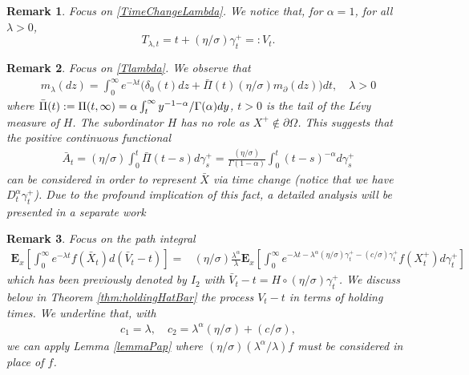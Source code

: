 \documentclass[11pt,a4paper]{article}
\newtheorem{remark}{Remark}[section]
\begin{document}
\begin{remark}
Focus on \eqref{TimeChangeLambda}. We notice that, for $\alpha=1$, for all $\lambda >0$, 
$$T_{\lambda,t}= t + (\eta/\sigma) \gamma^+_t =:V_t.$$
\end{remark}


\begin{remark}
Focus on \eqref{Tlambda}. We observe that
\begin{align*}
m_\lambda(dz) = \int_0^\infty e^{-\lambda t} \bigg( \delta_0(t) dz + \bar{\Pi}(t) (\eta/\sigma) m_\partial(dz) \bigg) dt, \quad \lambda>0
\end{align*}
where $\bar{\Pi}(t):=\Pi(t, \infty) = \alpha \int_t^\infty y^{-1-\alpha}/\Gamma(\-\alpha) dy$, $t>0$ is the tail of the L\'{e}vy measure of $H$. The subordinator $H$ has no role as $X^+ \notin \partial \Omega$. This suggests that the positive continuous functional
\begin{align*}
\bar{A}_t = (\eta/\sigma) \int_0^t \bar{\Pi}(t-s) d\gamma^+_s = \frac{(\eta/\sigma)}{\Gamma(1-\alpha)} \int_0^t (t-s)^{-\alpha} d\gamma^+_s 
\end{align*}
can be considered in order to represent $\bar{X}$ via time change (notice that we have $D^\alpha_t \gamma^+_t$). Due to the profound implication of this fact, a detailed analysis will be presented in a separate work
\end{remark}


\begin{remark}
Focus on the path integral
\begin{align*}
\mathbf{E}_x \left[ \int_0^\infty e^{-\lambda t} f(\bar{X}_t) d(\bar{V}_t - t) \right] 
= & (\eta/\sigma) \frac{\lambda^\alpha}{\lambda} \mathbf{E}_x \left[ \int_0^\infty e^{-\lambda t - \lambda^\alpha (\eta/\sigma) \gamma^+_t -(c/\sigma) \gamma^+_t} f(X^+_t) d\gamma^+_t \right]
\end{align*}
which has been previously denoted by $I_2$ with $\bar{V}_t - t = H \circ (\eta/\sigma) \gamma^+_t$. We discuss below in Theorem  \ref{thm:holdingHatBar} the process $V_t - t$ in terms of holding times. We underline that, with
\begin{align*}
c_1 = \lambda, \quad c_2 = \lambda^\alpha (\eta/\sigma) + (c/\sigma),
\end{align*}
we can apply Lemma \ref{lemmaPap} where $(\eta /\sigma) (\lambda^\alpha/\lambda) f$ must be considered in place of $f$. 
\end{remark}
\end{document}
